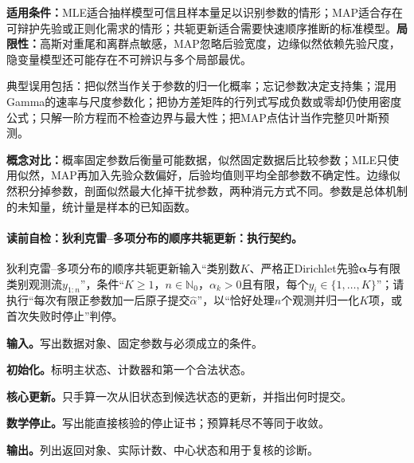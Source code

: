 \label{struct:V1-C05-CH30}
\label{struct:V1-C05-CH31}
\begin{applicabilitybox}
\textbf{适用条件：}MLE适合抽样模型可信且样本量足以识别参数的情形；MAP适合存在可辩护先验或正则化需求的情形；共轭更新适合需要快速顺序推断的标准模型。\textbf{局限性：}高斯对重尾和离群点敏感，MAP忽略后验宽度，边缘似然依赖先验尺度，隐变量模型还可能存在不可辨识与多个局部最优。
\end{applicabilitybox}

\label{struct:V1-C05-CH32}
\begin{warningbox}
典型误用包括：把似然当作关于参数的归一化概率；忘记参数决定支持集；混用Gamma的速率与尺度参数化；把协方差矩阵的行列式写成负数或零却仍使用密度公式；只解一阶方程而不检查边界与最大性；把MAP点估计当作完整贝叶斯预测。
\end{warningbox}

\label{struct:V1-C05-CH33}
\begin{comparisonbox}
\textbf{概念对比：}概率固定参数后衡量可能数据，似然固定数据后比较参数；MLE只使用似然，MAP再加入先验众数偏好，后验均值则平均全部参数不确定性。边缘似然积分掉参数，剖面似然最大化掉干扰参数，两种消元方式不同。参数是总体机制的未知量，统计量是样本的已知函数。
\end{comparisonbox}

\paragraph{读前自检：狄利克雷--多项分布的顺序共轭更新：执行契约。}狄利克雷--多项分布的顺序共轭更新输入“类别数$K$、严格正Dirichlet先验$\boldsymbol\alpha$与有限类别观测流$y_{1:n}$”，条件“$K\ge1$，$n\in\mathbb N_0$，$\alpha_k>0$且有限，每个$y_i\in\{1,\ldots,K\}$”；请执行“每次有限正参数加一后原子提交$\widehat\alpha$”，以“恰好处理$n$个观测并归一化$K$项，或首次失败时停止”判停。\par
\begin{keypointbox}[title={狄利克雷--多项分布的顺序共轭更新：五步阅读}]
\textbf{输入。}写出数据对象、固定参数与必须成立的条件。\par
\textbf{初始化。}标明主状态、计数器和第一个合法状态。\par
\textbf{核心更新。}只手算一次从旧状态到候选状态的更新，并指出何时提交。\par
\textbf{数学停止。}写出能直接核验的停止证书；预算耗尽不等同于收敛。\par
\textbf{输出。}列出返回对象、实际计数、中心状态和用于复核的诊断。
\end{keypointbox}

